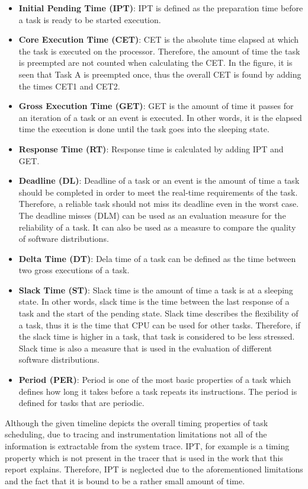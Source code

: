 \begin{itemize}
	\item \textbf{Initial Pending Time (IPT)}: IPT is defined as the preparation time before a task is ready to be started execution.
	\item \textbf{Core Execution Time (CET)}: CET is the absolute time elapsed at which the task is executed on the processor. Therefore, the amount of time the task is preempted are not counted when calculating the CET. In the figure, it is seen that Task A is preempted once, thus the overall CET is found by adding the times CET1 and CET2.
	\item \textbf{Gross Execution Time (GET)}: GET is the amount of time it passes for an iteration of a task or an event is executed. In other words, it is the elapsed time the execution is done until the task goes into the sleeping state.
	\item \textbf{Response Time (RT)}: Response time is calculated by adding IPT and GET. 
	\item \textbf{Deadline (DL)}: Deadline of a task or an event is the amount of time a task should be completed in order to meet the real-time requirements of the task. Therefore, a reliable task should not miss its deadline even in the worst case. The deadline misses (DLM) can be used as an evaluation measure for the reliability of a task. It can also be used as a measure to compare the quality of software distributions.
	\item \textbf{Delta Time (DT)}: Dela time of a task can be defined as the time between two gross executions of a task.
	\item \textbf{Slack Time (ST)}: Slack time is the amount of time a task is at a sleeping state. In other words, slack time is the time between the last response of a task and the start of the pending state. Slack time describes the flexibility of a task, thus it is the time that CPU can be used for other tasks. Therefore, if the slack time is higher in a task, that task is considered to be less stressed. Slack time is also a measure that is used in the evaluation of different software distributions. 
	\item \textbf{Period (PER)}: Period is one of the most basic properties of a task which defines how long it takes before a task repeats its instructions. The period is defined for tasks that are periodic.
\end{itemize}

Although the given timeline depicts the overall timing properties of task scheduling, due to tracing and instrumentation limitations not all of the information is extractable from the system trace. IPT, for example is a timing property which is not present in the tracer that is used in the work that this report explains. Therefore, IPT is neglected due to the aforementioned limitations and the fact that it is bound to be a rather small amount of time.

